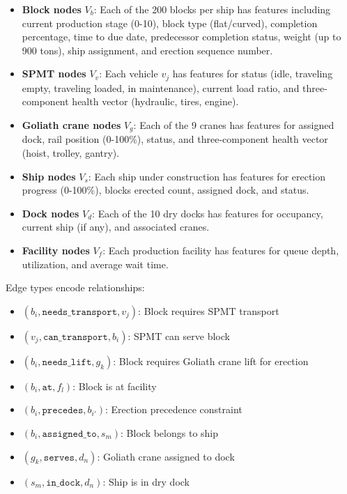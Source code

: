 \documentclass[11pt,a4paper]{article}
\begin{document}
\begin{itemize}
    \item \textbf{Block nodes} $V_b$: Each of the 200 blocks per ship has features including current production stage (0-10), block type (flat/curved), completion percentage, time to due date, predecessor completion status, weight (up to 900 tons), ship assignment, and erection sequence number.

    \item \textbf{SPMT nodes} $V_v$: Each vehicle $v_j$ has features for status (idle, traveling empty, traveling loaded, in maintenance), current load ratio, and three-component health vector (hydraulic, tires, engine).

    \item \textbf{Goliath crane nodes} $V_g$: Each of the 9 cranes has features for assigned dock, rail position (0-100\%), status, and three-component health vector (hoist, trolley, gantry).

    \item \textbf{Ship nodes} $V_s$: Each ship under construction has features for erection progress (0-100\%), blocks erected count, assigned dock, and status.

    \item \textbf{Dock nodes} $V_d$: Each of the 10 dry docks has features for occupancy, current ship (if any), and associated cranes.

    \item \textbf{Facility nodes} $V_f$: Each production facility has features for queue depth, utilization, and average wait time.
\end{itemize}

Edge types encode relationships:
\begin{itemize}
    \item $(b_i, \texttt{needs\_transport}, v_j)$: Block requires SPMT transport
    \item $(v_j, \texttt{can\_transport}, b_i)$: SPMT can serve block
    \item $(b_i, \texttt{needs\_lift}, g_k)$: Block requires Goliath crane lift for erection
    \item $(b_i, \texttt{at}, f_l)$: Block is at facility
    \item $(b_i, \texttt{precedes}, b_{i'})$: Erection precedence constraint
    \item $(b_i, \texttt{assigned\_to}, s_m)$: Block belongs to ship
    \item $(g_k, \texttt{serves}, d_n)$: Goliath crane assigned to dock
    \item $(s_m, \texttt{in\_dock}, d_n)$: Ship is in dry dock
\end{itemize}
\end{document}
